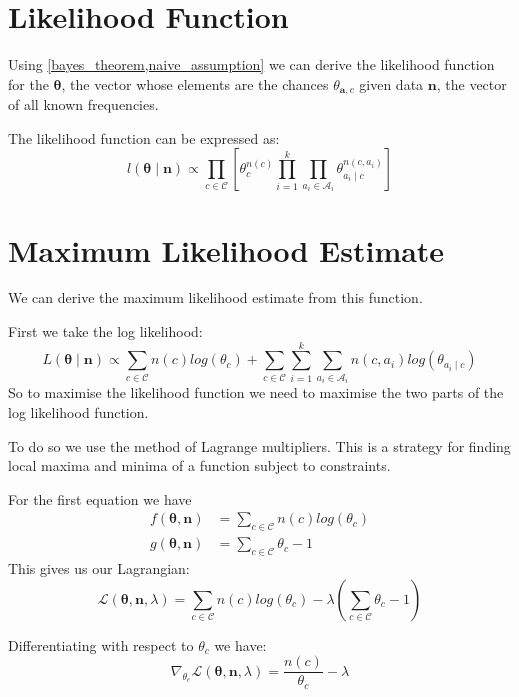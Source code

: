 \section{Likelihood Function}

Using \cref{bayes_theorem,naive_assumption} we can derive the likelihood function for the $\mathbf{\theta}$, the vector whose elements are the chances $\theta_{\mathbf{a}, c}$ given data $\mathbf{n}$, the vector of all known frequencies.

The likelihood function can be expressed as:
\begin{equation} \label{likelihood}
	l(\mathbf{\theta} \mid \mathbf{n}) \propto \prod_{c \in \mathcal{C}} \left[ \theta_c^{n(c)} \prod_{i=1}^k \prod_{a_i \in \mathcal{A}_i} \theta_{a_i \mid c}^{n(c, a_i)} \right]
\end{equation}

\section{Maximum Likelihood Estimate}

We can derive the maximum likelihood estimate from this function.

First we take the log likelihood:
\begin{equation}
	L(\mathbf{\theta} \mid \mathbf{n}) \propto \sum_{c \in \mathcal{C}}  n(c)log(\theta_c) + \sum_{c \in \mathcal{C}} \sum_{i=1}^k \sum_{a_i \in \mathcal{A}_i} n(c, a_i) log(\theta_{a_i \mid c}) 
\end{equation}
So to maximise the likelihood function we need to maximise the two parts of the log likelihood function.

To do so we use the method of Lagrange multipliers. This is a strategy for finding local maxima and minima of a function subject to constraints.

For the first equation we have
\begin{align}
	f(\mathbf{\theta}, \mathbf{n})& = \sum_{c \in \mathcal{C}}  n(c)log(\theta_c) \\
	g(\mathbf{\theta}, \mathbf{n})& = \sum_{c \in \mathcal{C}}  \theta_c - 1
\end{align}
This gives us our Lagrangian:
\begin{equation}
	\mathcal{L}(\mathbf{\theta}, \mathbf{n}, \lambda) = \sum_{c \in \mathcal{C}}  n(c)log(\theta_c) - \lambda(\sum_{c \in \mathcal{C}}  \theta_c - 1)
\end{equation}

Differentiating with respect to $\theta_c$ we have:
\begin{equation}
	\nabla_{\theta_c} \mathcal{L}(\mathbf{\theta}, \mathbf{n}, \lambda) = \frac{n(c)}{\theta_c} - \lambda
\end{equation}

